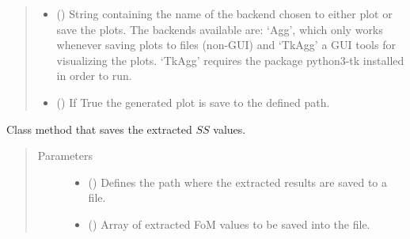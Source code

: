 \documentclass[letterpaper,10pt,english,openany, oneside]{sphinxmanual}
\begin{document}
\begin{fulllineitems}
\begin{fulllineitems}
\begin{quote}
\begin{description}
\begin{itemize}
\item {} 
 () \textendash{} String containing the name of the backend chosen to either plot or save the plots. The backends available are:
‘Agg’, which only works whenever saving plots to files (non-GUI) and ‘TkAgg’ a GUI tools for visualizing the plots.
‘TkAgg’ requires the package python3-tk installed in order to run.

\item {} 
 () \textendash{} If True the generated plot is save to the defined path.

\end{itemize}

\end{description}\end{quote}

\end{fulllineitems}


\begin{fulllineitems}
\label{\detokenize{index:fompy.fom.ss_ext.save_results_to_file}}
Class method that saves the extracted \(SS\) values.
\begin{quote}\begin{description}
\item[{Parameters}] \leavevmode\begin{itemize}
\item {} 
 () \textendash{} Defines the path where the extracted results are saved to a file.

\item {} 
 () \textendash{} Array of extracted FoM values to be saved into the file.

\end{itemize}

\end{description}\end{quote}

\end{fulllineitems}


\end{fulllineitems}
\end{document}
